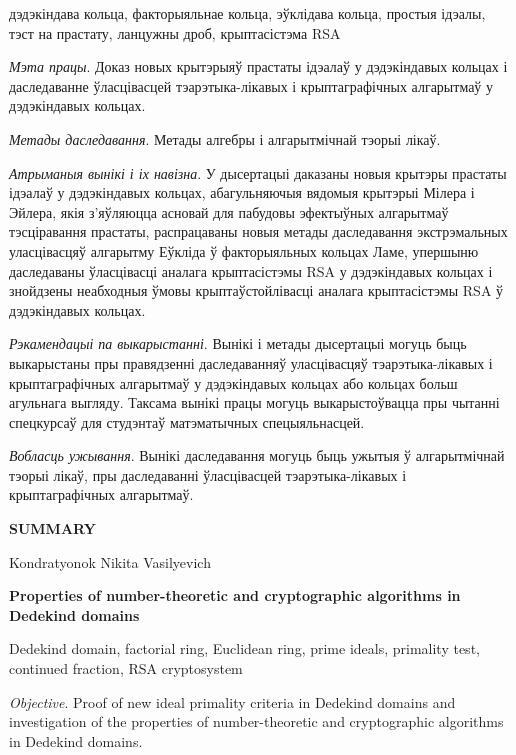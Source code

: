 \documentclass[_00_autoref.tex]{subfiles}
\begin{document}
\noindent
дэдэкіндава кольца, факторыяльнае кольца, эўклідава кольца, простыя ідэалы, тэст на прастату, ланцужны дроб, крыптасістэма RSA

\textit{Мэта працы}.
Доказ новых крытэрыяў прастаты ідэалаў у дэдэкіндавых кольцах і даследаванне ўласцівасцей тэарэтыка-лікавых і крыптаграфічных алгарытмаў у дэдэкіндавых кольцах.

\textit{Метады даследавання}.
Метады алгебры і алгарытмічнай тэорыі лікаў.

\textit{Атрыманыя вынікі і іх навізна}.
У дысертацыі даказаны новыя крытэры прастаты ідэалаў у дэдэкіндавых кольцах, абагульняючыя вядомыя крытэрыі Мілера і Эйлера, якія з'яўляюцца асновай для пабудовы эфектыўных алгарытмаў тэсціравання прастаты, распрацаваны новыя метады даследавання экстрэмальных уласцівасцяў алгарытму Еўкліда ў факторыяльных кольцах Ламе, упершыню даследаваны ўласцівасці аналага крыптасістэмы RSA у дэдэкіндавых кольцах і знойдзены неабходныя ўмовы крыптаўстойлівасці аналага крыптасістэмы RSA ў дэдэкіндавых кольцах.

\textit{Рэкамендацыі па выкарыстанні}.
Вынікі і метады дысертацыі могуць быць выкарыстаны пры правядзенні даследаванняў уласцівасцяў тэарэтыка-лікавых і крыптаграфічных алгарытмаў у дэдэкіндавых кольцах або кольцах больш агульнага выгляду.
Таксама вынікі працы могуць выкарыстоўвацца пры чытанні спецкурсаў для студэнтаў матэматычных спецыяльнасцей.

\textit{Вобласць ужывання}.
Вынікі даследавання могуць быць ужытыя ў алгарытмічнай тэорыі лікаў, пры даследаванні ўласцівасцей тэарэтыка-лікавых і крыптаграфічных алгарытмаў.

\newpage
\centerline{\textbf{SUMMARY}}

\vspace{-0.3ex}
\begin{center}
Kondratyonok Nikita Vasilyevich

\textbf{Properties of number-theoretic and cryptographic algorithms in Dedekind domains}
\end{center}
\vspace{-0.3ex}

\noindent
Dedekind domain, factorial ring, Euclidean ring, prime ideals, primality test, continued fraction, RSA cryptosystem

\textit{Objective}.
Proof of new ideal primality criteria in Dedekind domains and investigation of the properties of number-theoretic and cryptographic algorithms in Dedekind domains.
\end{document}
